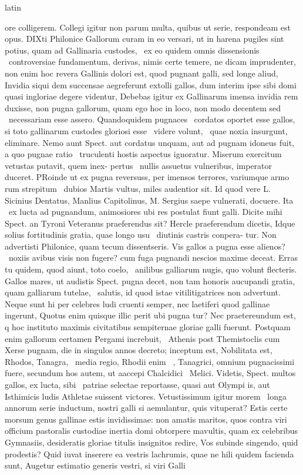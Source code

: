 \documentclass[12pt]{book}
\renewenvironment{latin}
    	{\begin{hyphenrules}{latin}}
    	{\end{hyphenrules}}
\begin{document}
\begin{pages}
\begin{latin}
\begin{Leftside}
ore colligerem. Collegi igitur non parum multa, quibus ut serie, respondeam est opus. DIXti Philonice Gallorum curam in eo versari, ut in harena pugiles sint potius, quam ad Gallinaria custodes, ﻿\ampersand\ ex eo quidem omnis dissensionis ﻿\ampersand\ controversiae fundamentum, derivas, nimis certe temere, ne dicam imprudenter, non enim hoc revera Gallinis dolori est, quod pugnant galli, sed longe aliud, Invidia siqui dem succensae aegreferunt extolli gallos, dum interim ipse sibi domi quasi ingloriae degere videntur, Debebas igitur ex Gallinarum imensa invidia rem duxisse, non pugna gallorum, quam ego hoc in loco, non modo decentem sed ﻿\ampersand\ necessariam esse assero. Quandoquidem pugnaces ﻿\ampersand\ cordatos oportet esse gallos, si toto gallinarum custodes gloriosi esse ﻿\ampersand\ videre volunt, ﻿\ampersand\ quae noxia insurgunt, eliminare. Nemo aunt Spect. aut cordatus unquam, aut ad pugnam idoneus fuit, a quo pugnae ratio ﻿\ampersand\ truculenti hostis aspectus ignoratur. Miserum exercitum vetustas putavit, quem inex-   pertus ﻿\ampersand\ nullis assuetus vulneribus, imperator duceret. PRoinde ut ex pugna reversuss, per imensos terrores, variumque armo rum strepitum ﻿\ampersand\ dubios Martis vultus, miles audentior sit. Id quod vere L. Sicinius Dentatus, Manlius Capitolinus, M. Sergius saepe vulnerati, docuere. Ita ﻿\ampersand\ ex lucta ad pugnandum, animosiores ubi res postulat fiunt galli. Dicite mihi Spect. an Tyroni Veteranus praeferendus sit? Hercle praeferendum dicetis, Idque solius fortitudinis gratia, quae longo usu ﻿\ampersand\ diutinis castris conpera- tur. Non advertisti Philonice, quam tecum dissentseris. Vis gallos a pugna esse alienos? ﻿\ampersand\ noxiis avibus visis non fugere? cum fuga pugnandi nescios maxime deceat. Erras tu quidem, quod aiunt, toto coelo, ﻿\ampersand\ anilibus galliarum nugis, quo volunt flecteris. Gallos mares, ut audistis Spect. pugna decet, non tam honoris aucupandi gratia, quam galliarum tutelae, ﻿\ampersand\ salutis, id quod istae vitilitigatrices non advertunt. Neque sunt hi per celebres ludi cruenti semper, nec laetiferi quod gallinae ingerunt, Quotus enim quisque illic perit ubi pugna tur? Nec praetereundum est, q hoc instituto maximis civitatibus sempiternae gloriae galli fuerunt. Postquam enim gallorum certamen Pergami increbuit, ﻿\ampersand\ Athenis post Themistoclis cum Xerse pugnam, die in singulos annos decreto; inceptum est, Nobilitata est, Rhodos, Tanagra, ﻿\ampersand\ media regio, Rhodii enim ﻿\ampersand\ , Tanagrici, omnium pugnacissimi fuere, secundum hos autem, ut aaccepi Chalcidici ﻿\ampersand\ Melici. Videtis, Spect. multos gallos, ex lucta, sibi ﻿\ampersand\ patriae selectae reportasse, quasi aut Olympi is, aut Isthimicis ludis Athletae suissent victores. Vetustissimum igitur morem ﻿\ampersand\ longa annorum serie inductum, nostri galli si aemulantur, quis vituperat? Estis certe morsum genus gallinae estis invidissimae: non amatis maritos, quos contra viri officium pastoralis custodiae inertia domi obtorpere mavultis, quam ex celebribus Gymnasiis, desideratis gloriae titulis insignitos redire,   Vos subinde singendo, quid prodestis? Quid iuvat inserere ea vestris lachrumis, quae ne hili quidem facienda sunt, Augetur estimatio generis vestri, si viri Galli 
\end{Leftside}
\end{latin}
\end{pages}
\end{document}
